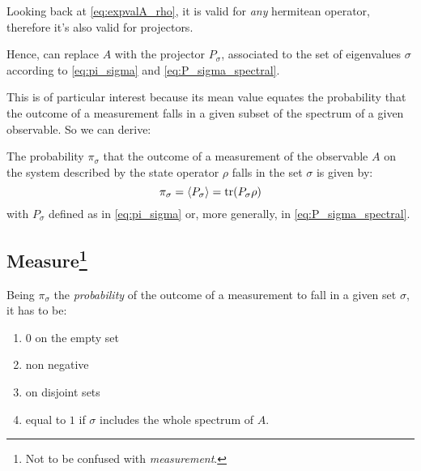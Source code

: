 
Looking back at \eqref{eq:expvalA_rho},
it is valid for \emph{any} hermitean operator,
therefore it's also valid for projectors.

Hence, can replace $A$ with the projector $P_{\sigma}$,
associated to the set of eigenvalues $\sigma$
according to \eqref{eq:pi_sigma} and \eqref{eq:P_sigma_spectral}.

This is of particular interest
because its mean value equates the probability that the outcome of a measurement
falls in a given subset of the spectrum of a given observable.
So we can derive:

\begin{proposition}\label{probability_rho}
  The probability $\pi_{\sigma}$
  that the outcome of a measurement of the observable $A$
  on the system described by the state operator $\rho$
  falls in the set $\sigma$
  is given by:
  \begin{equation}\label{eq:probability_rho}
    \pi_{\sigma} = \expval{P_{\sigma}} = \tr(P_{\sigma}\rho)
  \end{equation}
  with $P_{\sigma}$ defined as in \eqref{eq:pi_sigma}
  or, more generally, in \eqref{eq:P_sigma_spectral}.
\end{proposition}






\subsection[Measure]{Measure\footnote{Not to be confused with \emph{measurement}.}}

\begin{remark}\label{measure_properties}
  Being $\pi_{\sigma}$ the \emph{probability} of the outcome of a measurement to
  fall in a given set $\sigma$, it has to be:
  \begin{enumerate}
    \item \label{measure_properties:first} $0$ on the empty set
    \item non negative
    \item \label{measure_properties:last}  on disjoint sets
    \item equal to $1$ if $\sigma$ includes the whole spectrum of $A$.
  \end{enumerate}
\end{remark}

